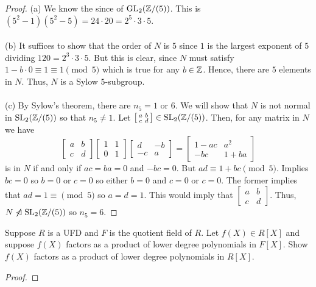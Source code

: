 \begin{proof}
(a) We know the since of $\operatorname{GL}_2(\mathbb{Z}/(5))$. This is $(5^2-1)(5^2-5)=24\cdot
20=2^5\cdot 3\cdot 5$.
\\\\
(b) It suffices to show that the order of $N$ is $5$ since $1$ is the
largest exponent of $5$ dividing $120=2^3\cdot 3\cdot 5$. But this is
clear, since $N$ must satisfy $1-b\cdot 0\equiv 1\equiv 1\pmod{5}$ which is
true for any $b\in\mathbb{Z}$. Hence, there are $5$ elements in $N$. Thus, $N$ is
a Sylow $5$-subgroup.
\\\\
(c) By Sylow's theorem, there are $n_5=1$ or $6$. We will show that $N$ is
not normal in $\operatorname{SL}_2(\mathbb{Z}/(5))$ so that $n_5\neq 1$. Let
$\left[\begin{smallmatrix}a&b\\c&d\end{smallmatrix}\right]\in\operatorname{SL}_2(\mathbb{Z}/(5))$. Then,
for any matrix in $N$ we have
\[
\begin{bmatrix}
a&b\\c&d
\end{bmatrix}
\begin{bmatrix}
1&1\\0&1
\end{bmatrix}
\begin{bmatrix}
d&-b\\
-c&a
\end{bmatrix}
=
\begin{bmatrix}
1-ac&a^2\\-bc&1+ba
\end{bmatrix}
\]
is in $N$ if and only if $ac=ba=0$ and $-bc=0$. But $ad\equiv
1+bc\pmod{5}$. Implies $bc=0$ so $b=0$ or $c=0$ so either $b=0$ and $c=0$
or $c=0$. The former implies that $ad=1\equiv\pmod{5}$ so $a=d=1$. This
would imply that
$\left[\begin{smallmatrix}a&b\\c&d\end{smallmatrix}\right]$. Thus,
$N\centernot\nlhd\SL_2(\bbZ/(5))$ so $n_5=6$.
\end{proof}

\begin{problem}
Suppose $R$ is a UFD and $F$ is the quotient field of $R$. Let $f(X)\in
R[X]$ and suppose $f(X)$ factors as a product of lower degree polynomials
in $F[X]$. Show $f(X)$ factors as a product of lower degree polynomials in
$R[X]$.
\end{problem}
\begin{proof}
\end{proof}

